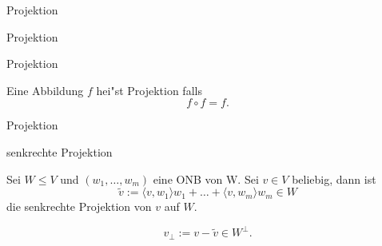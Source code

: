 \documentclass[class=article, crop=false]{standalone}
\begin{document}
\begin{zettel}{Projektion}
\begin{flashcard}{Projektion}
	\begin{question}
		Projektion
	\end{question}
	\begin{definition}[Projektion]
		Eine Abbildung $f$ hei"st Projektion falls
		\[
			f \circ f = f
		.\]
	\end{definition}
\end{flashcard}

\begin{flashcard}[emxz226m]{Projektion}
	\begin{question}
		senkrechte Projektion
	\end{question}
	\begin{definition}
		Sei $W \leq  V$  und $( w_1,\dots,w_m)$ eine ONB von W. Sei $v \in V$ beliebig, dann ist
		\[
			\tilde{v} := \langle v,w_1\rangle w_1 + \dots + \langle v,w_m\rangle w_m \in  W
		\]
		die senkrechte Projektion von $v$  auf $W$.

	\end{definition}
\end{flashcard}

\begin{lemma}
	\[
		v_{\perp} := v - \tilde{v} \in  W^{\perp}
	.\]
\end{lemma}
\end{zettel}
\end{document}
